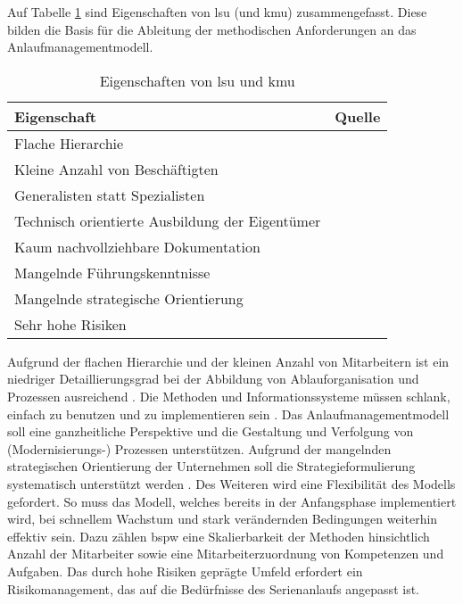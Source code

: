 Auf Tabelle \ref{tab:eigenschaften_lsu} sind Eigenschaften von \gls{lsu} (und \gls{kmu}) zusammengefasst. Diese bilden die Basis für die Ableitung der methodischen Anforderungen an das Anlaufmanagementmodell. 
\begin{table}[ht]
\caption{Eigenschaften von \gls{lsu} und \gls{kmu}} \label{tab:eigenschaften_lsu} 
\begin{center}
\begin{tabular}{l l}
\textbf{Eigenschaft} & \textbf{Quelle }\\ \hline
Flache Hierarchie & \autocite[10]{Dombrowski2009a} \\ 
Kleine Anzahl von Beschäftigten & \autocite[9]{Dombrowski2009a} \\
Generalisten statt Spezialisten & \autocite[9]{Dombrowski2009a}\\
Technisch orientierte Ausbildung der Eigentümer & \autocite[47]{Dombrowski2009a}\\
Kaum nachvollziehbare Dokumentation & \autocite[1]{Zimolong2006} \\
Mangelnde Führungskenntnisse & \autocite[47]{Dombrowski2009a}\\
Mangelnde strategische Orientierung & \autocite[48]{Dombrowski2009a}\\
Sehr hohe Risiken & \autocite[9]{Ries2011}\\
 \end{tabular} 
 \end{center}
\end{table}

Aufgrund der flachen Hierarchie und der kleinen Anzahl von Mitarbeitern ist ein niedriger Detaillierungsgrad bei der Abbildung von Ablauforganisation und Prozessen ausreichend \autocite[151]{Dombrowski2009a}. 
Die Methoden und Informationssysteme müssen schlank, einfach zu benutzen und zu implementieren sein \autocite[4]{Zimolong2007}. 
Das Anlaufmanagementmodell soll eine ganzheitliche Perspektive und die Gestaltung und Verfolgung von (Modernisierungs-) Prozessen unterstützen. Aufgrund der mangelnden strategischen Orientierung der Unternehmen soll die Strategieformulierung systematisch unterstützt werden \autocite[47-48]{Dombrowski2009a}.
Des Weiteren wird eine Flexibilität des Modells gefordert. So muss das Modell, welches bereits in der Anfangsphase implementiert wird, bei schnellem Wachstum und stark verändernden Bedingungen weiterhin effektiv sein. Dazu zählen \gls{bspw} eine Skalierbarkeit der Methoden hinsichtlich Anzahl der Mitarbeiter sowie eine Mitarbeiterzuordnung von Kompetenzen und Aufgaben. 
Das durch hohe Risiken geprägte Umfeld erfordert ein Risikomanagement, das auf die Bedürfnisse des Serienanlaufs angepasst ist. 



